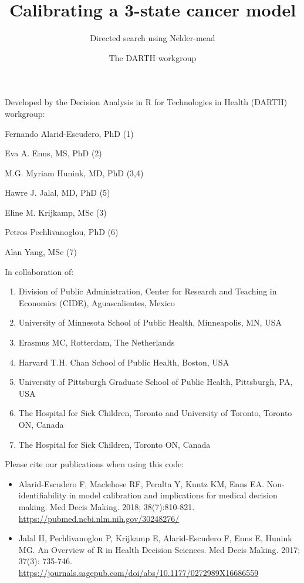 \documentclass[
]{article}
\title{Calibrating a 3-state cancer model}
\subtitle{Directed search using Nelder-mead}
\author{The DARTH workgroup}
\date{}
\providecommand{\tightlist}{%
  \setlength{\itemsep}{0pt}\setlength{\parskip}{0pt}}
\begin{document}
\maketitle

Developed by the Decision Analysis in R for Technologies in Health
(DARTH) workgroup:

Fernando Alarid-Escudero, PhD (1)

Eva A. Enns, MS, PhD (2)

M.G. Myriam Hunink, MD, PhD (3,4)

Hawre J. Jalal, MD, PhD (5)

Eline M. Krijkamp, MSc (3)

Petros Pechlivanoglou, PhD (6)

Alan Yang, MSc (7)

In collaboration of:

\begin{enumerate}
\def\labelenumi{\arabic{enumi}.}
\tightlist
\item
  Division of Public Administration, Center for Research and Teaching in
  Economics (CIDE), Aguascalientes, Mexico
\item
  University of Minnesota School of Public Health, Minneapolis, MN, USA
\item
  Erasmus MC, Rotterdam, The Netherlands
\item
  Harvard T.H. Chan School of Public Health, Boston, USA
\item
  University of Pittsburgh Graduate School of Public Health, Pittsburgh,
  PA, USA
\item
  The Hospital for Sick Children, Toronto and University of Toronto,
  Toronto ON, Canada
\item
  The Hospital for Sick Children, Toronto ON, Canada
\end{enumerate}

Please cite our publications when using this code:

\begin{itemize}
\item
  Alarid-Escudero F, Maclehose RF, Peralta Y, Kuntz KM, Enns EA.
  Non-identifiability in model calibration and implications for medical
  decision making. Med Decis Making. 2018; 38(7):810-821.
  \url{https://pubmed.ncbi.nlm.nih.gov/30248276/}
\item
  Jalal H, Pechlivanoglou P, Krijkamp E, Alarid-Escudero F, Enns E,
  Hunink MG. An Overview of R in Health Decision Sciences. Med Decis
  Making. 2017; 37(3): 735-746.
  \url{https://journals.sagepub.com/doi/abs/10.1177/0272989X16686559}
\end{itemize}
\end{document}
